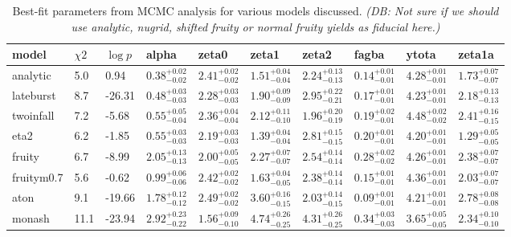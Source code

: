 \documentclass[fleqn,
usenatbib]{mnras}
\newcommand{\dbnote}[1]{ {\color{Thistle} \textit{\small (DB: #1)}} }
\begin{document}
\begin{table}
    \caption{
    Best-fit parameters from MCMC analysis for various models discussed.
    \dbnote{Not sure if we should use analytic, nugrid, shifted fruity or normal fruity yields as fiducial here.}}
    \begin{tabular}{l l l l l l l l l l} 
    \hline
    model            & $\chi2$  & $\log p$ & alpha & zeta0 & zeta1 & zeta2 & fagba & ytota & zeta1a\\
\hline
analytic         &      5.0 &     0.94 & $0.38^{+0.02}_{-0.02}$  &  $2.41^{+0.02}_{-0.02}$  &  $1.51^{+0.04}_{-0.04}$  &  $2.24^{+0.13}_{-0.13}$  &  $0.14^{+0.01}_{-0.01}$  &  $4.28^{+0.01}_{-0.01}$  &  $1.73^{+0.07}_{-0.07}$\\ 
lateburst        &      8.7 &   -26.31 & $0.48^{+0.03}_{-0.03}$  &  $2.28^{+0.03}_{-0.03}$  &  $1.90^{+0.09}_{-0.09}$  &  $2.95^{+0.22}_{-0.21}$  &  $0.17^{+0.01}_{-0.01}$  &  $4.23^{+0.01}_{-0.01}$  &  $2.18^{+0.13}_{-0.13}$\\ 
twoinfall        &      7.2 &    -5.68 & $0.55^{+0.05}_{-0.04}$  &  $2.36^{+0.04}_{-0.04}$  &  $2.12^{+0.11}_{-0.10}$  &  $1.96^{+0.20}_{-0.19}$  &  $0.19^{+0.02}_{-0.01}$  &  $4.48^{+0.02}_{-0.02}$  &  $2.41^{+0.16}_{-0.15}$\\ 
eta2             &      6.2 &    -1.85 & $0.55^{+0.03}_{-0.03}$  &  $2.19^{+0.03}_{-0.03}$  &  $1.39^{+0.04}_{-0.04}$  &  $2.81^{+0.15}_{-0.15}$  &  $0.20^{+0.01}_{-0.01}$  &  $4.20^{+0.01}_{-0.01}$  &  $1.29^{+0.05}_{-0.05}$\\ 
fruity           &      6.7 &    -8.99 & $2.05^{+0.13}_{-0.13}$  &  $2.00^{+0.05}_{-0.05}$  &  $2.27^{+0.07}_{-0.07}$  &  $2.54^{+0.14}_{-0.14}$  &  $0.28^{+0.02}_{-0.02}$  &  $4.26^{+0.01}_{-0.01}$  &  $2.38^{+0.07}_{-0.07}$\\ 
fruitym0.7      &      5.6 &    -0.62 & $0.99^{+0.06}_{-0.06}$  &  $2.42^{+0.02}_{-0.02}$  &  $1.63^{+0.04}_{-0.05}$  &  $2.38^{+0.14}_{-0.14}$  &  $0.15^{+0.01}_{-0.01}$  &  $4.36^{+0.01}_{-0.01}$  &  $2.03^{+0.07}_{-0.07}$\\ 
aton             &      9.1 &   -19.66 & $1.78^{+0.12}_{-0.12}$  &  $2.49^{+0.02}_{-0.02}$  &  $3.60^{+0.16}_{-0.15}$  &  $2.03^{+0.14}_{-0.15}$  &  $0.09^{+0.01}_{-0.01}$  &  $4.21^{+0.01}_{-0.01}$  &  $2.78^{+0.08}_{-0.08}$\\ 
monash           &     11.1 &   -23.94 & $2.92^{+0.23}_{-0.22}$  &  $1.56^{+0.09}_{-0.10}$  &  $4.74^{+0.26}_{-0.25}$  &  $4.31^{+0.26}_{-0.25}$  &  $0.34^{+0.03}_{-0.03}$  &  $3.65^{+0.05}_{-0.05}$  &  $2.34^{+0.10}_{-0.10}$\\ 

\end{tabular}
\end{table}
\end{document}
